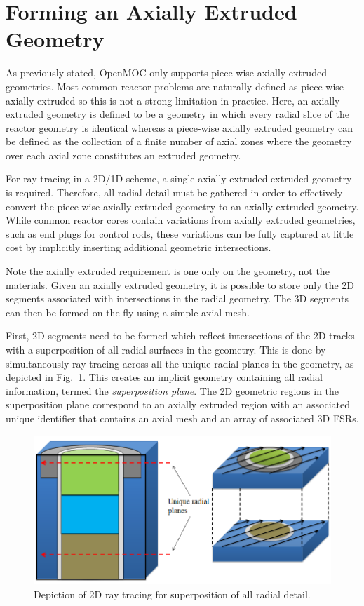 \section{Forming an Axially Extruded Geometry}

As previously stated, OpenMOC only supports piece-wise axially extruded geometries. Most common reactor problems are naturally defined as piece-wise axially extruded so this is not a strong limitation in practice. Here, an axially extruded geometry is defined to be a geometry in which every radial slice of the reactor geometry is identical whereas a piece-wise axially extruded geometry can be defined as the collection of a finite number of axial zones where the geometry over each axial zone constitutes an extruded geometry. 

For ray tracing in a 2D/1D scheme, a single axially extruded extruded geometry is required. Therefore, all radial detail must be gathered in order to effectively convert the piece-wise axially extruded geometry to an axially extruded geometry. While common reactor cores contain variations from axially extruded geometries, such as end plugs for control rods, these variations can be fully captured at little cost by implicitly inserting additional geometric intersections. 

Note the axially extruded requirement is one only on the geometry, not the materials. Given an axially extruded geometry, it is possible to store only the 2D segments associated with intersections in the radial geometry. The 3D segments can then be formed on-the-fly using a simple axial mesh.

First, 2D segments need to be formed which reflect intersections of the 2D tracks with a superposition of all radial surfaces in the geometry. This is done by simultaneously ray tracing across all the unique radial planes in the geometry, as depicted in Fig.~\ref{fig:superposition}. This creates an implicit geometry containing all radial information, termed the \textit{superposition plane}. The 2D geometric regions in the superposition plane correspond to an axially extruded region with an associated unique identifier that contains an axial mesh and an array of associated 3D FSRs. 

\begin{figure}[ht!]
	\centering
	\includegraphics[width=\linewidth]{figures/ph2016/new_unique_z_levels_v_extruded_rt2.png}
	\caption{Depiction of 2D ray tracing for superposition of all radial detail.}
	\label{fig:superposition}
\end{figure}

